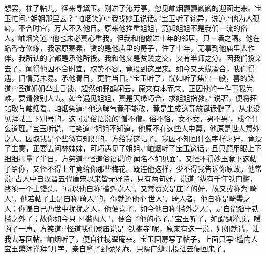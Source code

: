 \begin{parag}
    想罢，袖了帖儿，径来寻黛玉。刚过了沁芳亭，忽见岫烟颤颤巍巍的迎面走来。宝玉忙问:“姐姐那里去？”岫烟笑道:“我找妙玉说话。”宝玉听了诧异，说道:“他为人孤癖，不合时宜，万人不入他目。原来他推重姐姐，竟知姐姐不是我们一流的俗人。”岫烟笑道:“他也未必真心重我，但我和他做过十年的邻居，只一墙之隔。他在蟠香寺修炼，我家原寒素，赁的是他庙里的房子，住了十年，无事到他庙里去作伴。我所认的字都是承他所授。我和他又是贫贱之交，又有半师之分。因我们投亲去了，闻得他因不合时宜，权势不容，竟投到这里来。如今又天缘凑合，我们得遇，旧情竟未易。承他青目，更胜当日。”宝玉听了，恍如听了焦雷一般，喜的笑道:“怪道姐姐举止言谈，超然如野鹤闲云，原来有本而来。正因他的一件事我为难，要请教别人去。如今遇见姐姐，真是天缘巧合，求姐姐指教。” 说著，便将拜帖取与岫烟看。岫烟笑道:“他这脾气竟不能改，竟是生成这等放诞诡僻了。从来没见拜帖上下别号的，这可是俗语说的‘僧不僧，俗不俗，女不女，男不男’，成个什么道理。”宝玉听说，忙笑道:“姐姐不知道，他原不在这些人中算，他原是世人意外之人。因取我是个些微有知识的，方给我这帖子。我因不知回什么字样才好，竟没了主意，正要去问林妹妹，可巧遇见了姐姐。”岫烟听了宝玉这话，且只顾用眼上下细细打量了半日，方笑道:“怪道俗语说的‘闻名不如见面’，又怪不得妙玉竟下这帖子给你，又怪不得上年竟给你那些梅花。既连他这样，少不得我告诉你原故。他常说:‘古人中自汉晋五代唐宋以来皆无好诗，只有两句好，说道:”纵有千年铁门槛，终须一个土馒头。“所以他自称‘槛外之人’。又常赞文是庄子的好，故又或称为‘畸人’。他若帖子上是自称‘畸人’的，你就还他个‘世人’。畸人者，他自称是畸零之人；你谦自己乃世中扰扰之人，他便喜了。如今他自称‘槛外之人’，是自谓蹈于铁槛之外了；故你如今只下‘槛内人 ’，便合了他的心了。”宝玉听了，如醍醐灌顶，嗳哟了一声，方笑道:“怪道我们家庙说是 ‘铁槛寺’呢，原来有这一说。姐姐就请，让我去写回帖。”岫烟听了，便自往栊翠庵来。宝玉回房写了帖子，上面只写“槛内人宝玉熏沐谨拜”几字，亲自拿了到栊翠庵，只隔门缝儿投进去便回来了。
\end{parag}


